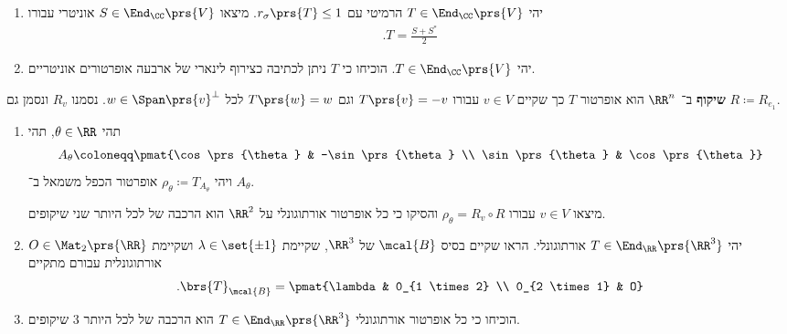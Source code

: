 \documentclass[a4paper,10pt,twoside,openany]{article}
\begin{document}
\begin{exercise}
\begin{enumerate}
\item
יהי
$T \in \End_\CC\prs{V}$
הרמיטי עם
$r_\sigma\prs{T} \leq 1$.
מיצאו
$S \in \End_\CC\prs{V}$
אוניטרי עבורו
\begin{align*}
\text{.} T = \frac{S + S^*}{2}
\end{align*}

\item יהי
$T \in \End_\CC\prs{V}$.
הוכיחו כי
$T$
ניתן לכתיבה כצירוף לינארי של ארבעה אופרטורים אוניטריים.
\end{enumerate}
\end{exercise}

\begin{exercise}
\textbf{שיקוף}
ב־%
$\RR^n$
הוא אופרטור
$T$
כך שקיים
$v \in V$
עבורו
$T\prs{v} = -v$
וגם
$T\prs{w} = w$
לכל
$w \in \Span\prs{v}^\perp$.
נסמנו
$R_v$
ונסמן גם
$R \coloneqq R_{e_1}$.

\begin{enumerate}
\item תהי
$\theta \in \RR$,
תהי
\begin{align*}
A_\theta \coloneqq \pmat{\cos\prs{\theta} & -\sin\prs{\theta} \\ \sin\prs{\theta} & \cos\prs{\theta}}
\end{align*}
ויהי
$\rho_\theta \coloneqq T_{A_\theta}$
אופרטור הכפל משמאל ב־%
$A_\theta$.

מיצאו
$v \in V$
עבורו
$\rho_\theta = R_v \circ R$
והסיקו כי כל אופרטור אורתוגונלי על
$\RR^2$
הוא הרכבה של לכל היותר שני שיקופים.

\item
יהי
$T \in \End_\RR\prs{\RR^3}$
אורתוגונלי. הראו שקיים בסיס
$\mcal{B}$
של
$\RR^3$,
שקיימת
$\lambda \in \set{\pm 1}$
ושקיימת
$O \in \Mat_2\prs{\RR}$
אורתוגונלית עבורם מתקיים
\begin{align*}
\text{.} \brs{T}_{\mcal{B}} = \pmat{\lambda & 0_{1 \times 2} \\ 0_{2 \times 1} & O}
\end{align*}
\item הוכיחו כי כל אופרטור אורתוגונלי
$T \in \End_\RR\prs{\RR^3}$
הוא הרכבה של לכל היותר
$3$
שיקופים.
\end{enumerate}
\end{exercise}
\end{document}

